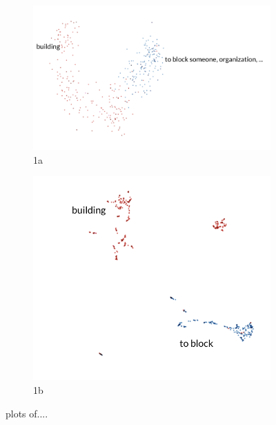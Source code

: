 \documentclass[a4paper,12pt,twoside,openright]{report}
\begin{document}
\begin{figure}
\begin{subfigure}{.5\textwidth}
  \centering
  \includegraphics[width=.8\linewidth]{./assets/analysis/block_pca.png}
  \caption{1a}
  \label{fig:sfig1}
\end{subfigure}%
\begin{subfigure}{.5\textwidth}
  \centering
  \includegraphics[width=.8\linewidth]{./assets/analysis/block_umap.png}
  \caption{1b}
  \label{fig:sfig2}
\end{subfigure}
\caption{plots of....}
\label{fig:fig}
\end{figure}
\end{document}
